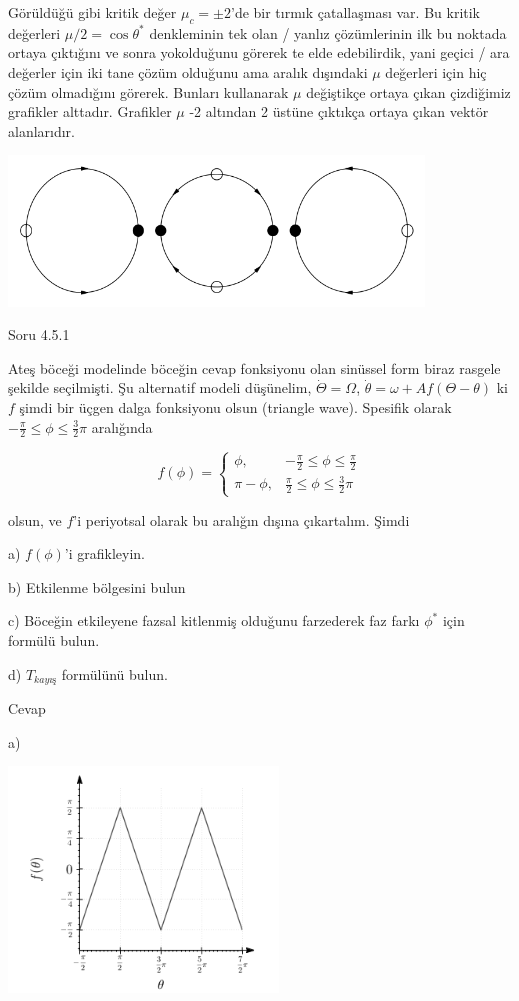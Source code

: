 \documentclass[12pt,fleqn]{article}\usepackage{../../common}
\begin{document}
Görüldüğü gibi kritik değer $\mu_c= \pm 2$'de bir tırmık çatallaşması var. Bu
kritik değerleri $\mu/2 = \cos\theta^*$ denkleminin tek olan / yanlız
çözümlerinin ilk bu noktada ortaya çıktığını ve sonra yokolduğunu görerek te
elde edebilirdik, yani geçici / ara değerler için iki tane çözüm olduğunu ama
aralık dışındaki $\mu$ değerleri için hiç çözüm olmadığını görerek. Bunları
kullanarak $\mu$ değiştikçe ortaya çıkan çizdiğimiz grafikler
alttadır. Grafikler $\mu$ -2 altından 2 üstüne çıktıkça ortaya çıkan vektör
alanlarıdır.

\includegraphics[height=4cm]{12_03.png}

Soru 4.5.1

Ateş böceği modelinde böceğin cevap fonksiyonu olan sinüssel form biraz rasgele
şekilde seçilmişti. Şu alternatif modeli düşünelim, $\dot{\Theta} = \Omega$,
$\dot{\theta} = \omega + A f(\Theta-\theta)$ ki $f$ şimdi bir üçgen dalga
fonksiyonu olsun (triangle wave). Spesifik olarak $-\frac{\pi}{2} \le \phi \le
\frac{3}{2}\pi$ aralığında 

$$ f(\phi) =
\left\{ \begin{array}{ll}
\phi, & -\frac{\pi}{2} \le \phi \le \frac{\pi}{2} \\
\pi-\phi, & \frac{\pi}{2} \le \phi \le \frac{3}{2}\pi
\end{array} \right.
$$

olsun, ve $f$'i periyotsal olarak bu aralığın dışına çıkartalım. Şimdi

a) $f(\phi)$'i grafikleyin.

b) Etkilenme bölgesini bulun

c) Böceğin etkileyene fazsal kitlenmiş olduğunu farzederek faz farkı $\phi^*$
için formülü bulun.

d) $T_{kayış}$ formülünü bulun.

Cevap

a)

\includegraphics[height=6cm]{12_04.png}
\end{document}
